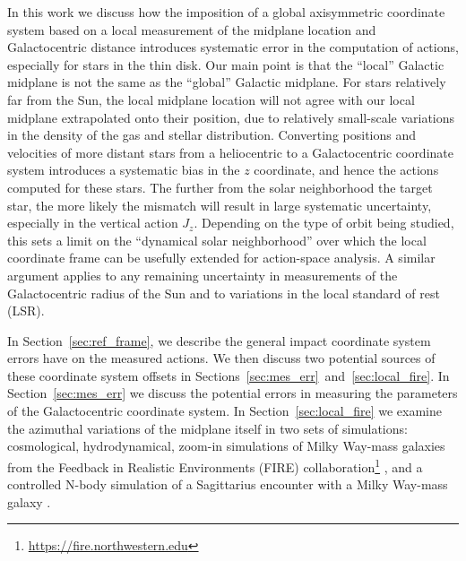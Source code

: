 \documentclass[twocolumn]{aastex62}
\begin{document}
In this work we discuss how the imposition of a global axisymmetric coordinate
system based on a local measurement of the midplane location and
Galactocentric distance introduces systematic error in the computation of
actions, especially for stars in the thin disk. Our main point is that the
``local'' Galactic midplane is not the same as the ``global'' Galactic
midplane. For stars relatively far from the Sun, the local midplane location
will not agree with our local midplane extrapolated onto their position,
due to relatively small-scale variations in the density of the gas and
stellar distribution. Converting positions and velocities of more distant
stars from a heliocentric to a Galactocentric coordinate system introduces a
systematic bias in the $z$ coordinate, and hence the actions computed for
these stars. The further from the solar neighborhood the target star, the more
likely the mismatch will result in large systematic uncertainty, especially in
the vertical action $J_z$. Depending on the type of orbit being studied, this
sets a limit on the ``dynamical solar neighborhood'' over which the local
coordinate frame can be usefully extended for action-space analysis. A similar
argument applies to any remaining uncertainty in measurements of the
Galactocentric radius of the Sun and to variations in the local
standard of rest (LSR).

In Section~\ref{sec:ref_frame}, we describe the general impact coordinate
system errors have on the measured actions. We then discuss two potential
sources of these coordinate system offsets in
Sections~\ref{sec:mes_err}~and~\ref{sec:local_fire}. In
Section~\ref{sec:mes_err} we discuss the potential errors in measuring the
parameters of the Galactocentric coordinate system. In
Section~\ref{sec:local_fire} we examine the azimuthal variations of the
midplane itself in two sets of simulations: cosmological, hydrodynamical,
zoom-in simulations of Milky Way-mass galaxies from the Feedback in Realistic
Environments (FIRE)
collaboration\footnote{\url{https://fire.northwestern.edu}}
\citep{2016ApJ...827L..23W, 2017arXiv170206148H}, and a controlled N-body
simulation of a Sagittarius encounter with a Milky Way-mass galaxy
\citep{2018MNRAS.481..286L}.
\end{document}
